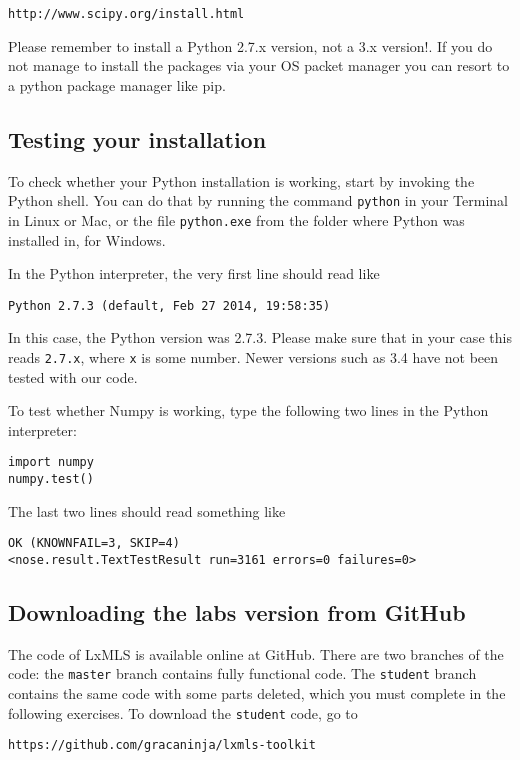 \begin{verbatim}
http://www.scipy.org/install.html
\end{verbatim}

Please remember to install a Python 2.7.x version, not a 3.x version!. If you
do not manage to install the packages via your OS packet manager you can 
resort to a python package manager like pip.  

\subsection{Testing your installation}

To check whether your Python installation is working, start by invoking the
Python shell. You can do that by running the command \verb+python+ in your
Terminal in Linux or Mac, or the file \verb+python.exe+ from the folder where
Python was installed in, for Windows.

In the Python interpreter, the very first line should read like
\begin{verbatim}
Python 2.7.3 (default, Feb 27 2014, 19:58:35)
\end{verbatim}
%
In this case, the Python version was 2.7.3. Please make sure that in your case
this reads \verb+2.7.x+, where \verb+x+ is some number. Newer versions such as
3.4 have not been tested with our code.

To test whether Numpy is working, type the following two lines in the Python interpreter:
%
\begin{verbatim}
import numpy
numpy.test()
\end{verbatim}
%
The last two lines should read something like
%
\begin{verbatim}
OK (KNOWNFAIL=3, SKIP=4)
<nose.result.TextTestResult run=3161 errors=0 failures=0>
\end{verbatim}

\subsection{Downloading the labs version from GitHub}

The code of LxMLS is available online at GitHub. There are two branches of the
code: the \verb+master+ branch contains fully functional code. The
\verb+student+ branch contains the same code with some parts deleted, which you
must complete in the following exercises. To download the \verb+student+ code,
go to

\begin{verbatim}
https://github.com/gracaninja/lxmls-toolkit
\end{verbatim}

